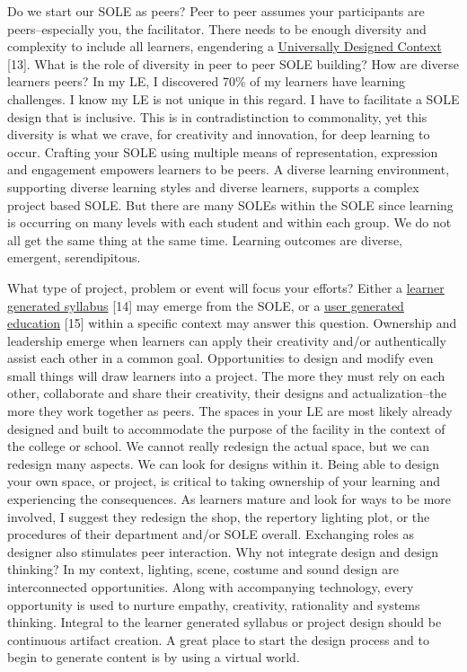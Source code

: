 Do we start our SOLE as peers? Peer to peer assumes your participants
are peers--especially you, the facilitator. There needs to be enough
diversity and complexity to include all learners, engendering a
\href{http://www.cast.org/library/UDLguidelines/}{Universally Designed
Context} {{[}13{]}}. What is the role of diversity in peer to peer SOLE
building? How are diverse learners peers? In my LE, I discovered 70\% of
my learners have learning challenges. I know my LE is not unique in this
regard. I have to facilitate a SOLE design that is inclusive. This is in
contradistinction to commonality, yet this diversity is what we crave,
for creativity and innovation, for deep learning to occur. Crafting your
SOLE using multiple means of representation, expression and engagement
empowers learners to be peers. A diverse learning environment,
supporting diverse learning styles and diverse learners, supports a
complex project based SOLE. But there are many SOLEs within the SOLE
since learning is occurring on many levels with each student and within
each group. We do not all get the same thing at the same time. Learning
outcomes are diverse, emergent, serendipitous.

What type of project, problem or event will focus your efforts? Either a
\href{http://www.theatreprof.com/2011/active-learning-student-generated-syllabus/}{learner
generated syllabus} {{[}14{]}} may emerge from the SOLE, or a
\href{http://usergeneratededucation.wordpress.com/}{user generated
education} {{[}15{]}} within a specific context may answer this
question. Ownership and leadership emerge when learners can apply their
creativity and/or authentically assist each other in a common goal.
Opportunities to design and modify even small things will draw learners
into a project. The more they must rely on each other, collaborate and
share their creativity, their designs and actualization--the more they
work together as peers. The spaces in your LE are most likely already
designed and built to accommodate the purpose of the facility in the
context of the college or school. We cannot really redesign the actual
space, but we can redesign many aspects. We can look for designs within
it. Being able to design your own space, or project, is critical to
taking ownership of your learning and experiencing the consequences. As
learners mature and look for ways to be more involved, I suggest they
redesign the shop, the repertory lighting plot, or the procedures of
their department and/or SOLE overall. Exchanging roles as designer also
stimulates peer interaction. Why not integrate design and design
thinking? In my context, lighting, scene, costume and sound design are
interconnected opportunities. Along with accompanying technology, every
opportunity is used to nurture empathy, creativity, rationality and
systems thinking. Integral to the learner generated syllabus or project
design should be continuous artifact creation. A great place to start
the design process and to begin to generate content is by using a
virtual world.

